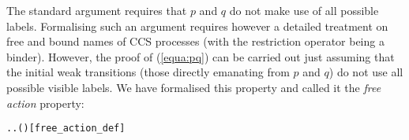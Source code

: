 The standard argument \cite{Mil89} requires that $p$
and $q$ do not make use of all possible labels.
Formalising such an argument requires however 
a detailed
treatment on free and bound names  of CCS
processes (with the restriction operator being a binder).
However, the proof of (\ref{equa:pq}) can be carried out 
just assuming that the
initial weak transitions (those directly emanating from 
 $p$ and $q$) do not use all possible visible labels.
We
have formalised this property and
 called it the \emph{free action} property:
\begin{alltt}
  \HOLSymConst{\HOLTokenEquiv{}} \HOLSymConst{\HOLTokenExists{}}. \HOLSymConst{\HOLTokenForall{}}. \HOLSymConst{\HOLTokenNeg{}}( \HOLTokenWeakTransBegin{} \HOLTokenWeakTransEnd {})\hfill{[free_action_def]}
\end{alltt}

